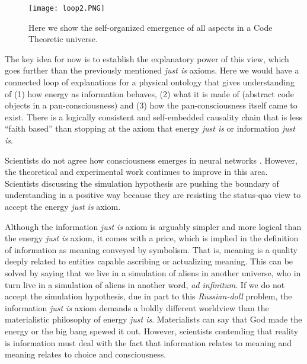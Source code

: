 \documentclass[submission,copyright,creativecommons]{eptcs}
\begin{document}
\begin{figure}[h!]
  \texttt{[image: loop2.PNG]}
\caption{Here we show the self-organized emergence of all aspects in a Code Theoretic universe.}
\label{fig:2}       %
\end{figure}
%


The key idea for now is to establish the explanatory power of this view, which goes further than the previously mentioned \textit{just is} axioms. Here we would have a connected loop of explanations for a physical ontology that gives understanding of (1) how energy as information behaves, (2) what it is made of (abstract code objects in a pan-consciousness) and (3) how the pan-consciousness itself came to exist. There is a logically consistent and self-embedded causality chain that is less “faith based” than stopping at the axiom that energy \textit{just is} or information \textit{just is}.

Scientists do not agree how consciousness emerges in neural networks \cite{seager2016theories}. However, the theoretical and experimental work continues to improve in this area. Scientists discussing the simulation hypothesis \cite{bostrom2009simulation} are pushing the boundary of understanding in a positive way because they are resisting the status-quo view to accept the energy \textit{just is} axiom.

Although the information \textit{just is} axiom is arguably simpler and more logical than the energy \textit{just is} axiom, it comes with a price, which is implied in the definition of information as meaning conveyed by symbolism. That is, meaning is a quality deeply related to entities capable ascribing or actualizing meaning. This can be solved by saying that we live in a simulation of aliens in another universe, who in turn live in a simulation of aliens in another word, \textit{ad infinitum}. If we do not accept the simulation hypothesis, due in part to this \textit{Russian-doll} problem, the information \textit{just is} axiom demands a boldly different worldview than the materialistic philosophy of energy \textit{just is}. Materialists can say that God made the energy or the big bang spewed it out. However, scientists contending that reality is information must deal with the fact that information relates to meaning and meaning relates to choice and consciousness.
\end{document}
